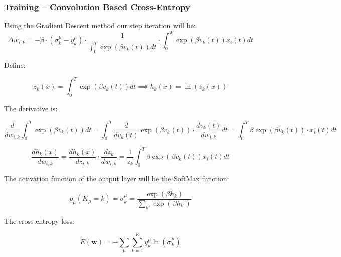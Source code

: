 \subsubsection{Training – Convolution Based Cross-Entropy}

\begin{mdframed}[backgroundcolor=red_background, linecolor=black, linewidth=2pt, frametitle=\textbf{Statement}]
\begin{center}

    \label{st:GD-cross-entr-convl-tempotron}
    Using the Gradient Descent method our step iteration will be:
    \begin{equation}
        \Delta w_{i,k} = -\beta \cdot (\sigma_k^{\mu} - y_k^{\mu}) \cdot \frac{1}{\int_0^T \exp(\beta v_k(t)) dt} \cdot \int_0^T \exp(\beta v_k(t)) x_i(t) dt
    \end{equation}

\end{center}
\end{mdframed}


Define: 

\begin{equation}
    z_k(x) = \int_0^T \exp(\beta v_k(t)) dt \implies h_k(x) = \ln(z_k(x))
\end{equation}

The derivative is:

\begin{equation}
    \frac{d}{dw_{i,k}} \int_0^T \exp(\beta v_k(t)) dt = \int_0^T \frac{d}{dv_k(t)} \exp(\beta v_k(t)) \cdot \frac{dv_k(t)}{dw_{i,k}} dt = \int_0^T \beta \exp(\beta v_k(t)) \cdot x_i(t) dt
\end{equation}

\begin{equation}
    \frac{dh_k(x)}{dw_{i,k}} = \frac{dh_k(x)}{dz_{i,k}} \cdot \frac{dz_k}{dw_{i,k}} = \frac{1}{z_k} \int_0^T \beta \exp(\beta v_k(t)) x_i(t) dt
\end{equation}

The activation function of the output layer will be the SoftMax function:

\begin{equation}
    p_{\mu}(K_{\mu}=k) = \sigma_k^{\mu} = \frac{\exp(\beta h_k)}{\sum_{k'} \exp(\beta h_{k'})}
\end{equation}

The cross-entropy loss:

\begin{equation}
    E(\mathbf{w}) = -\sum_{\mu} \sum_{k=1}^K y_k^{\mu} \ln(\sigma_k^{\mu})
\end{equation}

